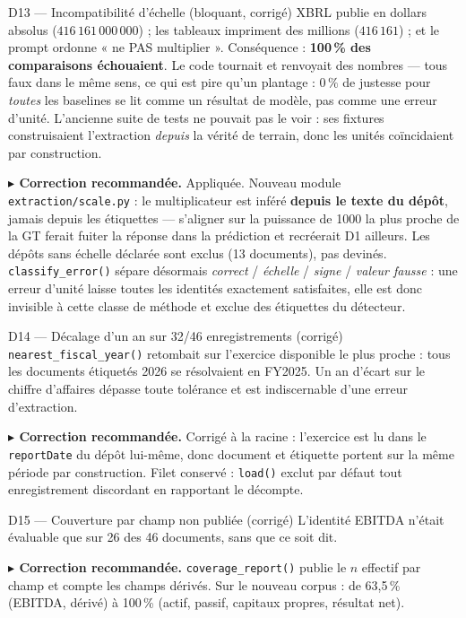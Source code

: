 \documentclass[11pt,a4paper]{article}
\newcommand{\corr}[1]{%
  \par\vspace{4pt}%
  \noindent\textbf{\textcolor{cExp}{$\blacktriangleright$ Correction recommandée.}} #1%
}
\newcommand{\fic}[1]{\texttt{\small #1}}
\begin{document}
\begin{fatal}{D13 --- Incompatibilité d'échelle (bloquant, corrigé)}
XBRL publie en dollars absolus ($416\,161\,000\,000$) ; les tableaux impriment des
millions ($416\,161$) ; et le prompt ordonne « ne PAS multiplier ». Conséquence :
\textbf{100\,\% des comparaisons échouaient}. Le code tournait et renvoyait des
nombres --- tous faux dans le même sens, ce qui est pire qu'un plantage : $0\,\%$ de
justesse pour \emph{toutes} les baselines se lit comme un résultat de modèle, pas
comme une erreur d'unité. L'ancienne suite de tests ne pouvait pas le voir : ses
fixtures construisaient l'extraction \emph{depuis} la vérité de terrain, donc les
unités coïncidaient par construction.

\corr{Appliquée. Nouveau module \fic{extraction/scale.py} : le multiplicateur est
inféré \textbf{depuis le texte du dépôt}, jamais depuis les étiquettes --- s'aligner
sur la puissance de 1000 la plus proche de la GT ferait fuiter la réponse dans la
prédiction et recréerait D1 ailleurs. Les dépôts sans échelle déclarée sont exclus
(13 documents), pas devinés. \fic{classify\_error()} sépare désormais
\emph{correct} / \emph{échelle} / \emph{signe} / \emph{valeur fausse} : une erreur
d'unité laisse toutes les identités exactement satisfaites, elle est donc invisible à
cette classe de méthode et exclue des étiquettes du détecteur.}
\end{fatal}

\begin{serieux}{D14 --- Décalage d'un an sur 32/46 enregistrements (corrigé)}
\fic{nearest\_fiscal\_year()} retombait sur l'exercice disponible le plus proche : tous
les documents étiquetés 2026 se résolvaient en FY2025. Un an d'écart sur le chiffre
d'affaires dépasse toute tolérance et est indiscernable d'une erreur d'extraction.

\corr{Corrigé à la racine : l'exercice est lu dans le \fic{reportDate} du dépôt
lui-même, donc document et étiquette portent sur la même période par construction.
Filet conservé : \fic{load()} exclut par défaut tout enregistrement discordant en
rapportant le décompte.}
\end{serieux}

\begin{serieux}{D15 --- Couverture par champ non publiée (corrigé)}
L'identité EBITDA n'était évaluable que sur 26 des 46 documents, sans que ce soit dit.

\corr{\fic{coverage\_report()} publie le $n$ effectif par champ et compte les champs
dérivés. Sur le nouveau corpus : de 63,5\,\% (EBITDA, dérivé) à 100\,\% (actif,
passif, capitaux propres, résultat net).}
\end{serieux}
\end{document}

